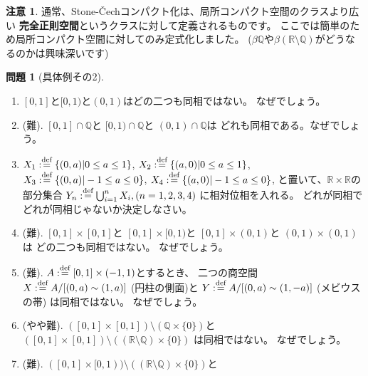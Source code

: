 \documentclass[uplatex]{jsarticle}
\theoremstyle{definition}
\newtheorem{prob}[prob]{問題}
\newtheorem*{rem*}{注意}
\newcommand{\dfn}{:\overset{\mbox{{\scriptsize def}}}{=}}
\newcommand{\R}{\mathbb{R}}
\newcommand{\Q}{\mathbb{Q}}
\begin{document}
\begin{rem*}
  通常、Stone-\v{C}echコンパクト化は、局所コンパクト空間のクラスより広い
  \textbf{完全正則空間}というクラスに対して定義されるものです。
  ここでは簡単のため局所コンパクト空間に対してのみ定式化しました。
  (\(\beta \Q\)や\(\beta (\R\setminus \Q)\)がどうなるのかは興味深いです)
\end{rem*}





\begin{prob}[具体例その2]
  \
  \begin{enumerate}
    \item
    \([0,1]\)と\([0,1)\)と\((0,1)\)はどの二つも同相ではない。
    なぜでしょう。
    \item (難).
    \([0,1]\cap \Q\)と
    \([0,1)\cap \Q\)と
    \((0,1)\cap \Q\)は
    どれも同相である。なぜでしょう。
    \item
    \(X_1 \dfn \{(0,a) | 0\leq a \leq 1\}\),
    \(X_2 \dfn \{(a,0) | 0\leq a \leq 1\}\),
    \(X_3 \dfn \{(0,a) | -1\leq a \leq 0\}\),
    \(X_4 \dfn \{(a,0) | -1\leq a \leq 0\}\),
    と置いて、\(\R\times \R\)の部分集合
    \(Y_n\dfn \bigcup_{i=1}^n X_i, (n=1,2,3,4)\)
    に相対位相を入れる。
    どれが同相でどれが同相じゃないか決定しなさい。
    \item (難).
    \([0,1]\times [0,1]\)と
    \([0,1]\times [0,1)\)と
    \([0,1]\times (0,1)\)と
    \((0,1)\times (0,1)\)は
    どの二つも同相ではない。
    なぜでしょう。
    \item (難).
    \(A\dfn [0,1]\times (-1,1)\)とするとき、
    二つの商空間
    \(X\dfn A/[(0,a) \sim (1,a)]\) (円柱の側面)と
    \(Y\dfn A/[(0,a) \sim (1,-a)]\) (メビウスの帯) は同相ではない。
    なぜでしょう。
    \item (やや難).
    \(([0,1]\times [0,1])\setminus (\Q\times \{0\})\)と
    \(([0,1]\times [0,1])\setminus ((\R\setminus \Q)\times \{0\})\)
    は同相ではない。
    なぜでしょう。
    \item (難).
    \(([0,1]\times [0,1))\setminus ((\R\setminus \Q)\times \{0\})\)と

\end{enumerate}
\end{prob}
\end{document}

